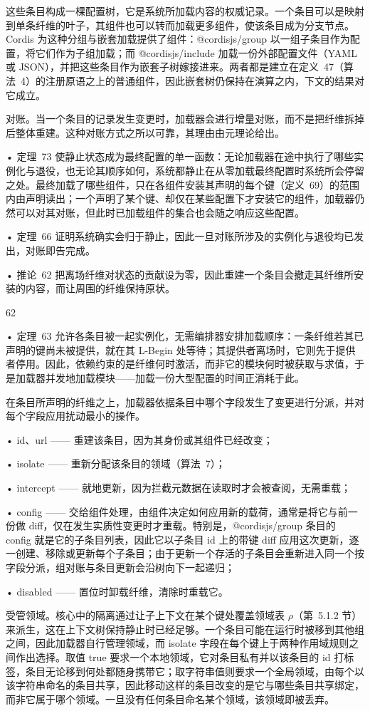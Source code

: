 \documentclass[
  10
]{article}
\begin{document}
这些条目构成一棵配置树，它是系统所加载内容的权威记录。一个条目可以是映射到单条纤维的叶子，其组件也可以转而加载更多组件，使该条目成为分支节点。Cordis 为这种分组与嵌套加载提供了组件：@cordisjs/group 以一组子条目作为配置，将它们作为子组加载；而 @cordisjs/include 加载一份外部配置文件（YAML 或 JSON），并把这些条目作为嵌套子树嫁接进来。两者都是建立在定义~47（算法~4）的注册原语之上的普通组件，因此嵌套树仍保持在演算之内，下文的结果对它成立。

对账。当一个条目的记录发生变更时，加载器会进行增量对账，而不是把纤维拆掉后整体重建。这种对账方式之所以可靠，其理由由元理论给出。

• 定理~73 使静止状态成为最终配置的单一函数：无论加载器在途中执行了哪些实例化与退役，也无论其顺序如何，系统都静止在从零加载最终配置时系统所会停留之处。最终加载了哪些组件，只在各组件安装其声明的每个键（定义~69）的范围内由声明读出；一个声明了某个键、却仅在某些配置下才安装它的组件，加载器仍然可以对其对账，但此时已加载组件的集合也会随之响应这些配置。

• 定理~66 证明系统确实会归于静止，因此一旦对账所涉及的实例化与退役均已发出，对账即告完成。

• 推论~62 把离场纤维对状态的贡献设为零，因此重建一个条目会撤走其纤维所安装的内容，而让周围的纤维保持原状。

62

• 定理~63 允许各条目被一起实例化，无需编排器安排加载顺序：一条纤维若其已声明的键尚未被提供，就在其 L-Begin 处等待；其提供者离场时，它则先于提供者停用。因此，依赖约束的是纤维何时激活，而非它的模块何时被获取与求值，于是加载器并发地加载模块——加载一份大型配置的时间正消耗于此。

在条目所声明的纤维之上，加载器依据条目中哪个字段发生了变更进行分派，并对每个字段应用扰动最小的操作。

• id、url —— 重建该条目，因为其身份或其组件已经改变；

• isolate —— 重新分配该条目的领域（算法~7）；

• intercept —— 就地更新，因为拦截元数据在读取时才会被查阅，无需重载；

• config —— 交给组件处理，由组件决定如何应用新的载荷，通常是将它与前一份做 diff，仅在发生实质性变更时才重载。特别是，@cordisjs/group 条目的 config 就是它的子条目列表，因此它以子条目 id 上的带键 diff 应用这次更新，逐一创建、移除或更新每个子条目；由于更新一个存活的子条目会重新进入同一个按字段分派，组对账与条目更新会沿树向下一起递归；

• disabled —— 置位时卸载纤维，清除时重载它。

受管领域。核心中的隔离通过让子上下文在某个键处覆盖领域表 \(\rho\)（第~5.1.2 节）来派生，这在上下文树保持静止时已经足够。一个条目可能在运行时被移到其他组之间，因此加载器自行管理领域，而 isolate 字段在每个键上于两种作用域规则之间作出选择。取值 true 要求一个本地领域，它对条目私有并以该条目的 id 打标签，条目无论移到何处都随身携带它；取字符串值则要求一个全局领域，由每个以该字符串命名的条目共享，因此移动这样的条目改变的是它与哪些条目共享绑定，而非它属于哪个领域。一旦没有任何条目命名某个领域，该领域即被丢弃。
\end{document}
